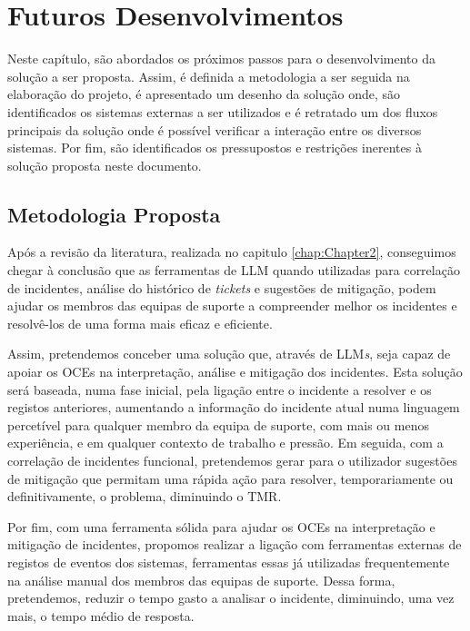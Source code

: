 
\chapter{Futuros Desenvolvimentos} %
\label{chap:Chapter3} %

Neste capítulo, são abordados os próximos passos para o desenvolvimento da solução a ser proposta. Assim, é definida a metodologia a ser seguida na elaboração do projeto, é apresentado um desenho da solução onde, são identificados os sistemas externas a ser utilizados e é retratado um dos fluxos principais da solução onde é possível verificar a interação entre os diversos sistemas. Por fim, são identificados os pressupostos e restrições inerentes à solução proposta neste documento. 

\section{Metodologia Proposta}

	Após a revisão da literatura, realizada no capitulo \ref{chap:Chapter2}, conseguimos chegar à conclusão que as ferramentas de \gls{LLM} quando utilizadas para correlação de incidentes, análise do histórico de \textit{tickets} e sugestões de mitigação, podem ajudar os membros das equipas de suporte a compreender melhor os incidentes e resolvê-los de uma forma mais eficaz e eficiente.
	
	Assim, pretendemos conceber uma solução que, através de \gls{LLM}\textit{s}, seja capaz de apoiar os \gls{OCEs} na interpretação, análise e mitigação dos incidentes. Esta solução será baseada, numa fase inicial, pela ligação entre o incidente a resolver e os registos anteriores, aumentando a informação do incidente atual numa linguagem percetível para qualquer membro da equipa de suporte, com mais ou menos experiência, e em qualquer contexto de trabalho e pressão. Em seguida, com a correlação de incidentes funcional, pretendemos gerar para o utilizador sugestões de mitigação que permitam uma rápida ação para resolver, temporariamente ou definitivamente, o problema, diminuindo o \gls{TMR}.
	
	Por fim, com uma ferramenta sólida para ajudar os \gls{OCEs} na interpretação e mitigação de incidentes, propomos realizar a ligação com ferramentas externas de registos de eventos dos sistemas, ferramentas essas já utilizadas frequentemente na análise manual dos membros das equipas de suporte. Dessa forma, pretendemos, reduzir o tempo gasto a analisar o incidente, diminuindo, uma vez mais, o tempo médio de resposta.

